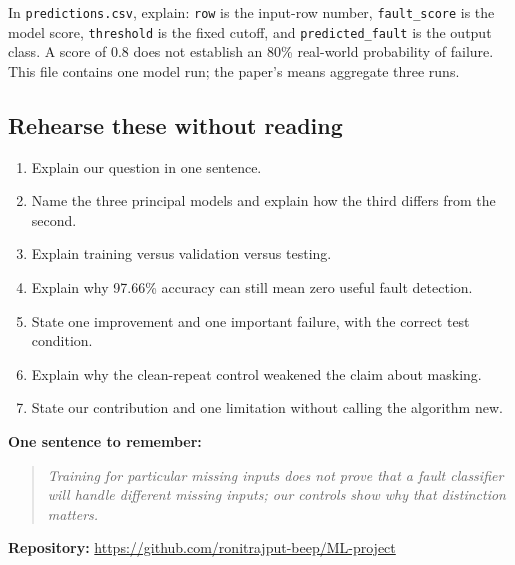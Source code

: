 \documentclass[11pt,a4paper]{article}
\newcommand{\say}[1]{\begin{quote}\itshape #1\end{quote}}
\begin{document}
In \texttt{predictions.csv}, explain: \texttt{row} is the input-row number, \texttt{fault\_score} is the model score, \texttt{threshold} is the fixed cutoff, and \texttt{predicted\_fault} is the output class. A score of 0.8 does not establish an 80\% real-world probability of failure. This file contains one model run; the paper's means aggregate three runs.

\subsection*{Rehearse these without reading}
\begin{enumerate}
\item Explain our question in one sentence.
\item Name the three principal models and explain how the third differs from the second.
\item Explain training versus validation versus testing.
\item Explain why 97.66\% accuracy can still mean zero useful fault detection.
\item State one improvement and one important failure, with the correct test condition.
\item Explain why the clean-repeat control weakened the claim about masking.
\item State our contribution and one limitation without calling the algorithm new.
\end{enumerate}

\textbf{One sentence to remember:}
\say{Training for particular missing inputs does not prove that a fault classifier will handle different missing inputs; our controls show why that distinction matters.}

\textbf{Repository:} \url{https://github.com/ronitrajput-beep/ML-project}
\end{document}
